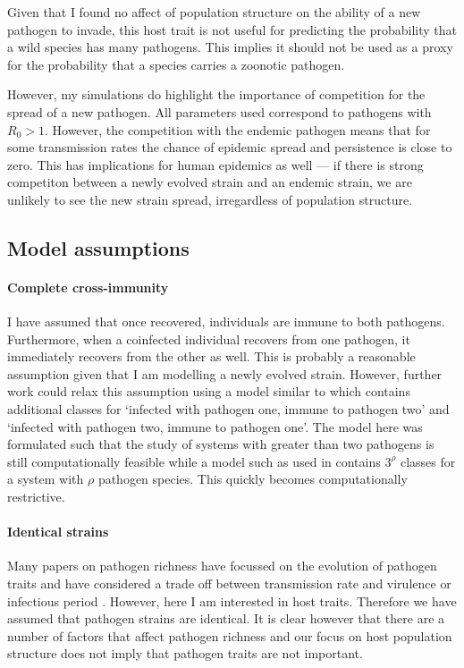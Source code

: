 Given that I found no affect of population structure on the ability of a new pathogen to invade, this host trait is not useful for predicting the probability that a wild species has many pathogens.
This implies it should not be used as a proxy for the probability that a species carries a zoonotic pathogen.

However, my simulations do highlight the importance of competition for the spread of a new pathogen.
All parameters used correspond to pathogens with $R_0>1$.
However, the competition with the endemic pathogen means that for some transmission rates the chance of epidemic spread and persistence is close to zero.
This has implications for human epidemics as well --- if there is strong competiton between a newly evolved strain and an endemic strain, we are unlikely to see the new strain spread, irregardless of population structure.




\subsection{Model assumptions}

\paragraph{Complete cross-immunity}

I have assumed that once recovered, individuals are immune to both pathogens. 
Furthermore, when a coinfected individual recovers from one pathogen, it immediately recovers from the other as well.
This is probably a reasonable assumption given that I am modelling a newly evolved strain.
However, further work could relax this assumption using a model similar to \cite{poletto2015characterising} which contains additional classes for `infected with pathogen one, immune to pathogen two' and `infected with pathogen two, immune to pathogen one'.
The model here was formulated such that the study of systems with greater than two pathogens is still computationally feasible while a model such as used in \cite{poletto2015characterising} contains $3^\rho$ classes for a system with $\rho$ pathogen species.
This quickly becomes computationally restrictive.

\paragraph{Identical strains}

Many papers on pathogen richness have focussed on the evolution of pathogen traits and have considered a trade off between transmission rate and virulence \cite{nowak1994superinfection, nowak1994superinfection} or infectious period \cite{poletto2013host}.
However, here I am interested in host traits.
Therefore we have assumed that pathogen strains are identical.
It is clear however that there are a number of factors that affect pathogen richness and our focus on host population structure does not imply that pathogen traits are not important.

